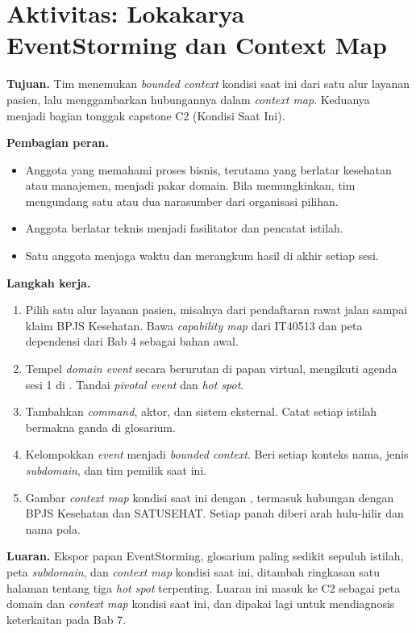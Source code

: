 \section{Aktivitas: Lokakarya EventStorming dan Context Map}

\textbf{Tujuan.} Tim menemukan \textit{bounded context} kondisi saat ini dari satu alur layanan
pasien, lalu menggambarkan hubungannya dalam \textit{context map}. Keduanya menjadi bagian tonggak
capstone C2 (Kondisi Saat Ini).

\textbf{Pembagian peran.}
\begin{itemize}
  \item Anggota yang memahami proses bisnis, terutama yang berlatar kesehatan atau manajemen,
        menjadi pakar domain. Bila memungkinkan, tim mengundang satu atau dua narasumber dari
        organisasi pilihan.
  \item Anggota berlatar teknis menjadi fasilitator dan pencatat istilah.
  \item Satu anggota menjaga waktu dan merangkum hasil di akhir setiap sesi.
\end{itemize}

\textbf{Langkah kerja.}
\begin{enumerate}
  \item Pilih satu alur layanan pasien, misalnya dari pendaftaran rawat jalan sampai klaim BPJS
        Kesehatan. Bawa \textit{capability map} dari IT40513 dan peta dependensi dari Bab 4 sebagai
        bahan awal.
  \item Tempel \textit{domain event} secara berurutan di papan virtual, mengikuti agenda sesi 1
        di . Tandai \textit{pivotal
        event} dan \textit{hot spot}.
  \item Tambahkan \textit{command}, aktor, dan sistem eksternal. Catat setiap istilah bermakna
        ganda di glosarium.
  \item Kelompokkan \textit{event} menjadi \textit{bounded context}. Beri setiap konteks nama,
        jenis \textit{subdomain}, dan tim pemilik saat ini.
  \item Gambar \textit{context map} kondisi saat ini dengan
        , termasuk hubungan dengan BPJS
        Kesehatan dan SATUSEHAT. Setiap panah diberi arah hulu-hilir dan nama pola.
\end{enumerate}

\textbf{Luaran.} Ekspor papan EventStorming, glosarium paling sedikit sepuluh istilah, peta
\textit{subdomain}, dan \textit{context map} kondisi saat ini, ditambah ringkasan satu halaman
tentang tiga \textit{hot spot} terpenting. Luaran ini masuk ke C2 sebagai peta domain dan
\textit{context map} kondisi saat ini, dan dipakai lagi untuk mendiagnosis keterkaitan pada Bab 7.

